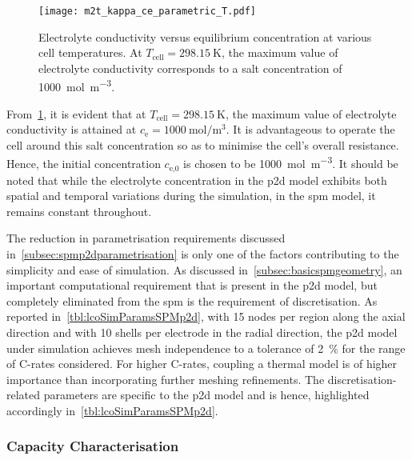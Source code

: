 \begin{figure}[!htb]
    \centering
    \texttt{[image: m2t\_kappa\_ce\_parametric\_T.pdf]}
    \caption[Electrolyte conductivity versus concentration at various cell
    temperatures]{Electrolyte conductivity versus equilibrium concentration at
        various cell temperatures. At ${T_\text{cell} = \SI{298.15}{\kelvin}}$,
        the maximum value of electrolyte conductivity corresponds to a salt
    concentration of \SI{1000}{\mol\per\meter\cubed}.}
    \label{fig:kappavsce}
\end{figure}

From~\cref{fig:kappavsce},       it        is       evident        that       at
$T_\text{cell}=\SI{298.15}{\kelvin}$,   the   maximum   value   of   electrolyte
conductivity is attained at  $c_\text{e} = \SI{1000}{\mole\per\meter\cubed}$. It
is advantageous  to operate  the cell  around this salt  concentration so  as to
minimise  the  cell's  overall  resistance.  Hence,  the  initial  concentration
$c_\text{e,0}$ is  chosen to  be \SI{1000}{\mole\per\meter\cubed}. It  should be
noted that while  the electrolyte concentration in the  \gls{p2d} model exhibits
both spatial  and temporal  variations during the  simulation, in  the \gls{spm}
model, it remains constant throughout.

The      reduction      in      parametrisation      requirements      discussed
in~\cref{subsec:spmp2dparametrisation}    is   only    one   of    the   factors
contributing  to   the  simplicity   and  ease   of  simulation.   As  discussed
in~\cref{subsec:basicspmgeometry},   an   important  computational   requirement
that   is  present   in   the  \gls{p2d}   model,   but  completely   eliminated
from  the   \gls{spm}  is  the   requirement  of  discretisation.   As  reported
in~\cref{tbl:lcoSimParamsSPMp2d},  with  15 nodes  per  region  along the  axial
direction  and  with 10  shells  per  electrode  in  the radial  direction,  the
\gls{p2d}  model under  simulation  achieves mesh  independence  to a  tolerance
of  \approx\SI{2}{\percent} for  the  range of  C-rates  considered. For  higher
C-rates, coupling  a thermal  model is of  higher importance  than incorporating
further   meshing  refinements.   The   discretisation-related  parameters   are
specific  to  the   \gls{p2d}  model  and  is   hence,  highlighted  accordingly
in~\cref{tbl:lcoSimParamsSPMp2d}.

\subsubsection*{Capacity Characterisation}\label{subsubsec:capcharspmp2d}


